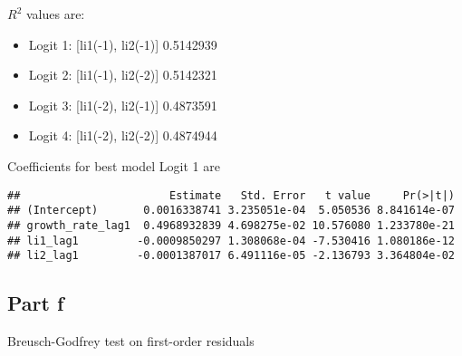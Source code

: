 \documentclass[]{article}
\newenvironment{Shaded}{\begin{snugshade}}{\end{snugshade}}
\newcommand{\CommentTok}[1]{\textcolor[rgb]{0.56,0.35,0.01}{\textit{#1}}}
\newcommand{\DataTypeTok}[1]{\textcolor[rgb]{0.13,0.29,0.53}{#1}}
\newcommand{\DecValTok}[1]{\textcolor[rgb]{0.00,0.00,0.81}{#1}}
\newcommand{\KeywordTok}[1]{\textcolor[rgb]{0.13,0.29,0.53}{\textbf{#1}}}
\newcommand{\NormalTok}[1]{#1}
\newcommand{\OperatorTok}[1]{\textcolor[rgb]{0.81,0.36,0.00}{\textbf{#1}}}
\newcommand{\StringTok}[1]{\textcolor[rgb]{0.31,0.60,0.02}{#1}}
\providecommand{\tightlist}{%
  \setlength{\itemsep}{0pt}\setlength{\parskip}{0pt}}
\begin{document}
\(R^{2}\) values are:

\begin{itemize}
\tightlist
\item
  Logit 1: {[}li1(-1), li2(-1){]} 0.5142939
\item
  Logit 2: {[}li1(-1), li2(-2){]} 0.5142321
\item
  Logit 3: {[}li1(-2), li2(-1){]} 0.4873591
\item
  Logit 4: {[}li1(-2), li2(-2){]} 0.4874944
\end{itemize}

Coefficients for best model Logit 1 are

\begin{Shaded}
\end{Shaded}

\begin{verbatim}
##                       Estimate   Std. Error   t value     Pr(>|t|)
## (Intercept)       0.0016338741 3.235051e-04  5.050536 8.841614e-07
## growth_rate_lag1  0.4968932839 4.698275e-02 10.576080 1.233780e-21
## li1_lag1         -0.0009850297 1.308068e-04 -7.530416 1.080186e-12
## li2_lag1         -0.0001387017 6.491116e-05 -2.136793 3.364804e-02
\end{verbatim}

\hypertarget{part-f}{%
\subsection{Part f}\label{part-f}}

Breusch-Godfrey test on first-order residuals

\begin{Shaded}
\end{Shaded}
\end{document}
